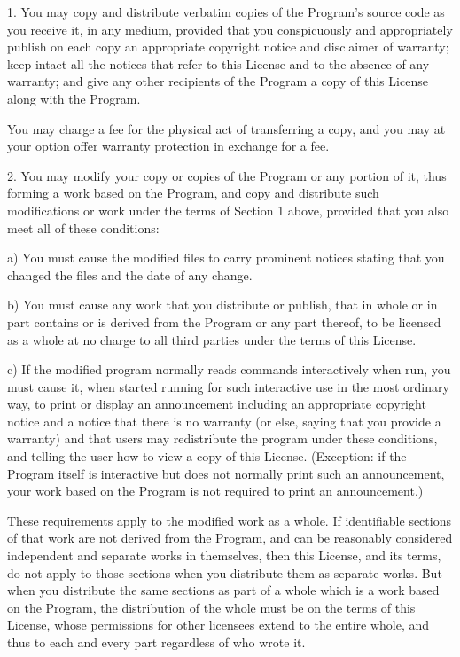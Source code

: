 \documentclass{doc}
\begin{document}
  1. You may copy and distribute verbatim copies of the Program's
source code as you receive it, in any medium, provided that you
conspicuously and appropriately publish on each copy an appropriate
copyright notice and disclaimer of warranty; keep intact all the
notices that refer to this License and to the absence of any warranty;
and give any other recipients of the Program a copy of this License
along with the Program.

You may charge a fee for the physical act of transferring a copy, and
you may at your option offer warranty protection in exchange for a fee.

  2. You may modify your copy or copies of the Program or any portion
of it, thus forming a work based on the Program, and copy and
distribute such modifications or work under the terms of Section 1
above, provided that you also meet all of these conditions:

    a) You must cause the modified files to carry prominent notices
    stating that you changed the files and the date of any change.

    b) You must cause any work that you distribute or publish, that in
    whole or in part contains or is derived from the Program or any
    part thereof, to be licensed as a whole at no charge to all third
    parties under the terms of this License.

    c) If the modified program normally reads commands interactively
    when run, you must cause it, when started running for such
    interactive use in the most ordinary way, to print or display an
    announcement including an appropriate copyright notice and a
    notice that there is no warranty (or else, saying that you provide
    a warranty) and that users may redistribute the program under
    these conditions, and telling the user how to view a copy of this
    License.  (Exception: if the Program itself is interactive but
    does not normally print such an announcement, your work based on
    the Program is not required to print an announcement.)

These requirements apply to the modified work as a whole.  If
identifiable sections of that work are not derived from the Program,
and can be reasonably considered independent and separate works in
themselves, then this License, and its terms, do not apply to those
sections when you distribute them as separate works.  But when you
distribute the same sections as part of a whole which is a work based
on the Program, the distribution of the whole must be on the terms of
this License, whose permissions for other licensees extend to the
entire whole, and thus to each and every part regardless of who wrote it.
\end{document}
